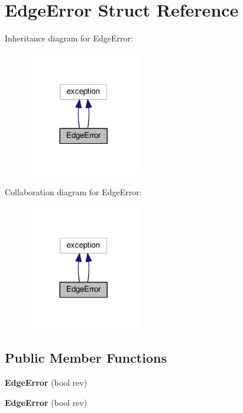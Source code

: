 \hypertarget{structEdgeError}{\section{Edge\+Error Struct Reference}
\label{structEdgeError}
}


Inheritance diagram for Edge\+Error\+:\nopagebreak
\begin{figure}[H]
\begin{center}
\leavevmode
\includegraphics[width=140pt]{structEdgeError__inherit__graph}
\end{center}
\end{figure}


Collaboration diagram for Edge\+Error\+:\nopagebreak
\begin{figure}[H]
\begin{center}
\leavevmode
\includegraphics[width=140pt]{structEdgeError__coll__graph}
\end{center}
\end{figure}
\subsection*{Public Member Functions}
\begin{DoxyCompactItemize}
\item 
\hypertarget{structEdgeError_a92ca9588f65b2b4d17139ff80eb29ab3}{{\bfseries Edge\+Error} (bool rev)}\label{structEdgeError_a92ca9588f65b2b4d17139ff80eb29ab3}

\item 
\hypertarget{structEdgeError_a92ca9588f65b2b4d17139ff80eb29ab3}{{\bfseries Edge\+Error} (bool rev)}\label{structEdgeError_a92ca9588f65b2b4d17139ff80eb29ab3}

\end{DoxyCompactItemize}
